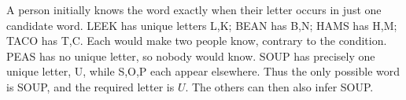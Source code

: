 A person initially knows the word exactly when their letter occurs in just one candidate word. LEEK has unique letters L,K; BEAN has B,N; HAMS has H,M; TACO has T,C. Each would make two people know, contrary to the condition. PEAS has no unique letter, so nobody would know. SOUP has precisely one unique letter, U, while S,O,P each appear elsewhere. Thus the only possible word is SOUP, and the required letter is $\boxed{U}$. The others can then also infer SOUP.
